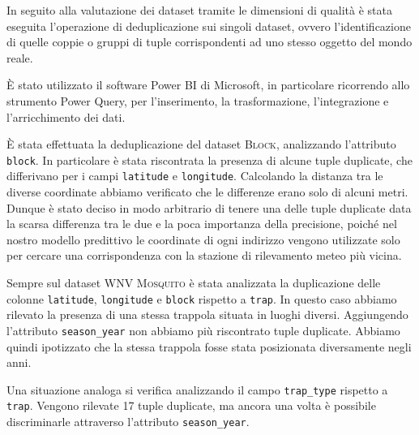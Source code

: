 In seguito alla valutazione dei dataset tramite le dimensioni di qualità è 
stata eseguita l'operazione di deduplicazione sui singoli dataset, ovvero 
l'identificazione di quelle coppie o gruppi di tuple corrispondenti ad uno 
stesso oggetto del mondo reale.

È stato utilizzato il software Power BI di Microsoft, 
in particolare ricorrendo allo strumento Power Query, per l'inserimento, la 
trasformazione, l'integrazione e l'arricchimento dei dati.

È stata effettuata la deduplicazione del dataset \textsc{Block}, 
analizzando l'attributo \texttt{block}. In particolare è stata riscontrata 
la presenza di alcune tuple duplicate, che differivano per i campi 
\texttt{latitude} e \texttt{longitude}. Calcolando la distanza tra le diverse 
coordinate abbiamo verificato che le differenze erano solo di alcuni metri.
Dunque è stato deciso in modo arbitrario di tenere una delle tuple duplicate 
data la scarsa differenza tra le due e la poca importanza della precisione, 
poiché nel nostro modello predittivo le coordinate di ogni indirizzo vengono 
utilizzate solo per cercare una corrispondenza con la stazione di rilevamento 
meteo più vicina.

Sempre sul dataset \textsc{WNV Mosquito} è stata analizzata la duplicazione 
delle colonne \texttt{latitude}, \texttt{longitude} e \texttt{block} rispetto a 
\texttt{trap}. In questo caso abbiamo rilevato la presenza di una stessa 
trappola situata in luoghi diversi. Aggiungendo l'attributo 
\texttt{season\_year} non abbiamo più riscontrato tuple duplicate. Abbiamo 
quindi ipotizzato che la stessa trappola fosse stata posizionata diversamente 
negli anni.

Una situazione analoga si verifica analizzando il campo \texttt{trap\_type} 
rispetto a \texttt{trap}. Vengono rilevate 17 tuple duplicate, ma ancora una 
volta è possibile discriminarle attraverso l'attributo \texttt{season\_year}.


